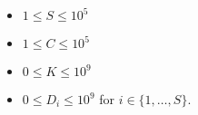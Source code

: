 \begin{itemize}
\tightlist
\item $1\le S\le 10^5$
\item $1\le C\le 10^5$
\item $0\le K \le 10^9$
\item $0\le D_i \le 10^9$ for $i\in\{1,\dots,S\}$.
\end{itemize}
